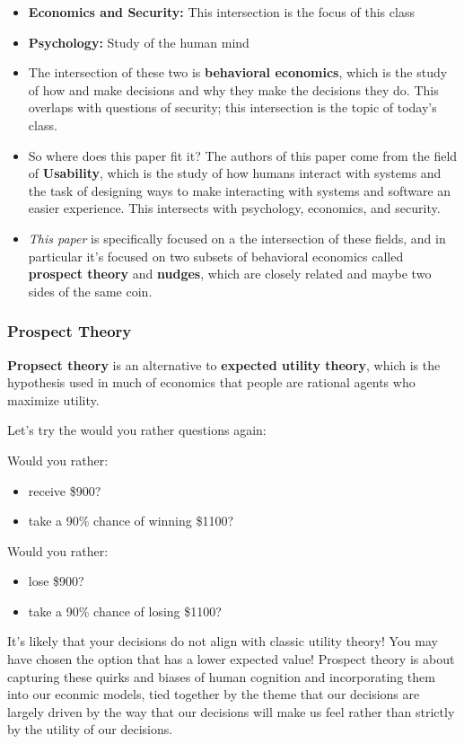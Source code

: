 \documentclass[11pt]{article}
\begin{document}
\begin{itemize}
    \item {\bf Economics and Security:} This intersection is the focus of this class
    \item {\bf Psychology:} Study of the human mind 
    \item The intersection of these two is {\bf behavioral economics}, which is the study of how and make decisions and why they make the decisions they do. This overlaps with questions of security; this intersection is the topic of today's class.
    \item So where does this paper fit it? The authors of this paper come from the field of {\bf Usability}, which is the study of how humans interact with systems and the task of designing ways to make interacting with systems and software an easier experience. This intersects with psychology, economics, and security.
    \item {\it This paper} is specifically focused on a the intersection of these fields, and in particular it's focused on two subsets of behavioral economics called {\bf prospect theory} and {\bf nudges}, which are closely related and maybe two sides of the same coin. 
\end{itemize}

\subsubsection{Prospect Theory}
{\bf Propsect theory} is an alternative to {\bf expected utility theory}, which is the hypothesis used in much of economics that people are rational agents who maximize utility.

Let's try the would you rather questions again: 

Would you rather:
\begin{itemize}
    \item receive \$900?
    \item take a 90\% chance of winning \$1100?
\end{itemize}

Would you rather:
\begin{itemize}
    \item lose \$900?
    \item take a 90\% chance of losing \$1100?
\end{itemize}

It's likely that your decisions do not align with classic utility theory! You may have chosen the option that has a lower expected value! Prospect theory is about capturing these quirks and biases of human cognition and incorporating them into our econmic models, tied together by the theme that our decisions are largely driven by the way that our decisions will make us feel rather than strictly by the utility of our decisions.
\end{document}

